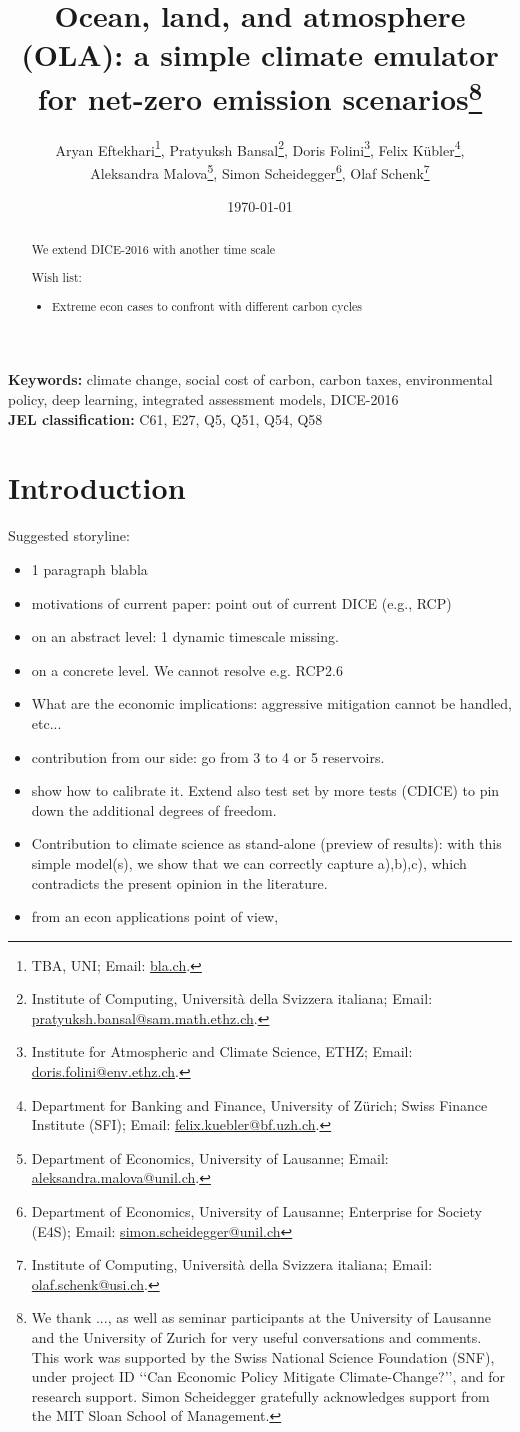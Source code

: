 \documentclass[11pt, a4paper, pdftex, twoside, dvipsnames]{article}
\title{Ocean, land, and atmosphere (OLA): a simple climate emulator for net-zero emission scenarios\thanks{We thank ..., as well as seminar participants at the University of Lausanne and the University of Zurich for very useful conversations and comments. This work was supported by the Swiss National Science Foundation (SNF), under project ID  \lq\lq Can Economic Policy Mitigate Climate-Change?\rq\rq, and for research support. Simon Scheidegger gratefully acknowledges support from the MIT Sloan School of Management.}}
\author{
    Aryan Eftekhari\thanks{TBA, UNI; Email:
    \href{mailto:bla}{bla.ch}.}, \;
    Pratyuksh Bansal\thanks{Institute of Computing, Universit\`a della Svizzera italiana; Email:
    \href{mailto:pratyuksh.bansal@sam.math.ethz.ch}{pratyuksh.bansal@sam.math.ethz.ch}.}, \;
    Doris Folini\thanks{Institute for Atmospheric and Climate Science, ETHZ; Email:
    \href{mailto:doris.folini@env.ethz.ch}{doris.folini@env.ethz.ch}.}, \;
  Felix K\"ubler\thanks{Department for Banking and Finance, University of Z\"urich; Swiss Finance Institute (SFI); Email: \href{mailto:fkubler@gmail.com}{felix.kuebler@bf.uzh.ch}.}, \\ \;
  Aleksandra Malova\thanks{Department of Economics, University of Lausanne; Email: \href{mailto:malova.alex@unil.ch}{aleksandra.malova@unil.ch}.}, \; 
  Simon Scheidegger\thanks{Department of Economics, University of Lausanne; Enterprise for Society (E4S); Email: \href{mailto:simon.scheidegger@unil.ch}{simon.scheidegger@unil.ch}}, \;
  Olaf Schenk\thanks{Institute of Computing, Universit\`a della Svizzera italiana; Email: \href{mailto:olaf.schenk@usi.ch}{olaf.schenk@usi.ch}.}
  }
\date{\today}
\begin{document}
\maketitle

\begin{abstract}
 We extend DICE-2016 with another time scale
 
 Wish list:
 \begin{itemize}
     \item Extreme econ cases to confront with different carbon cycles
 \end{itemize}

  \end{abstract}

{\small {\bf Keywords:} climate change, social cost of carbon, carbon taxes, environmental policy, deep learning, integrated assessment models, DICE-2016} \\

{\small {\bf JEL classification:} C61, E27, Q5, Q51, Q54, Q58} 



\newpage

\newpage

%
\section{Introduction}
\label{sec:intro}
%
Suggested storyline:
\begin{itemize}
    \item 1 paragraph blabla
    \item motivations of current paper: point out of current DICE (e.g., RCP)
    \item on an abstract level: 1 dynamic timescale missing.
    \item on a concrete level. We cannot resolve e.g. RCP2.6
    \item What are the economic implications: aggressive mitigation cannot be handled, etc...
    \item contribution from our side: go from 3 to 4 or 5 reservoirs.
    \item show how to calibrate it. Extend also test set by more tests (CDICE) to pin down the additional degrees of freedom.
    \item Contribution to climate science as stand-alone (preview of results): with this simple model(s), we show that we can correctly capture a),b),c), which contradicts the present opinion in the literature.
    \item from an econ applications point of view, 
\end{itemize}
\end{document}
